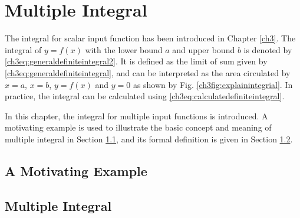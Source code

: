 \chapter{Multiple Integral} \label{ch7ch}

The integral for scalar input function has been introduced in Chapter \ref{ch3}. The integral of $y=f(x)$ with the lower bound $a$ and upper bound $b$ is denoted by \eqref{ch3eq:generaldefiniteintegral2}. It is defined as the limit of sum given by \eqref{ch3eq:generaldefiniteintegral}, and can be interpreted as the area circulated by $x=a$, $x=b$, $y=f(x)$ and $y=0$ as shown by Fig. \ref{ch3fig:explainintegrial}. In practice, the integral can be calculated using \eqref{ch3eq:calculatedefiniteintegral}.

In this chapter, the integral for multiple input functions is introduced. A motivating example is used to illustrate the basic concept and meaning of multiple integral in Section \ref{ch7sec:motivatingexp}, and its formal definition is given in Section \ref{ch7sec:multipleintegral}.

\section{A Motivating Example} \label{ch7sec:motivatingexp}

\section{Multiple Integral} \label{ch7sec:multipleintegral}

